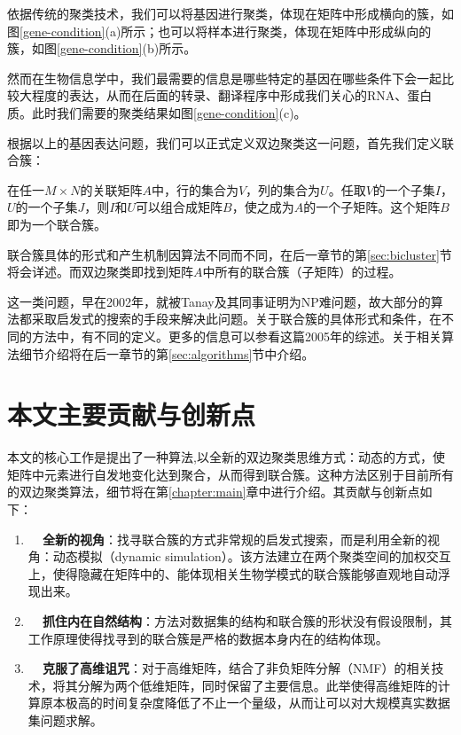 依据传统的聚类技术，我们可以将基因进行聚类，体现在矩阵中形成横向的簇，如图\ref{gene-condition}(a)所示；也可以将样本进行聚类，体现在矩阵中形成纵向的簇，如图\ref{gene-condition}(b)所示。


然而在生物信息学中，我们最需要的信息是哪些特定的基因在哪些条件下会一起比较大程度的表达，从而在后面的转录、翻译程序中形成我们关心的RNA、蛋白质。此时我们需要的聚类结果如图\ref{gene-condition}(c)。

根据以上的基因表达问题，我们可以正式定义双边聚类这一问题，首先我们定义联合簇：
\begin{dingyi}
\label{dingyi:bicluster}
在任一$M\times N$的关联矩阵$A$中，行的集合为$V$，列的集合为$U$。任取$V$的一个子集$I$，$U$的一个子集$J$，则$I$和$U$可以组合成矩阵$B$，使之成为$A$的一个子矩阵。这个矩阵$B$即为一个联合簇。
\end{dingyi}

联合簇具体的形式和产生机制因算法不同而不同，在后一章节的第\ref{sec:bicluster}节将会详述。而双边聚类即找到矩阵$A$中所有的联合簇（子矩阵）的过程。


这一类问题，早在2002年，就被Tanay及其同事证明为NP难问题，故大部分的算法都采取启发式的搜索的手段来解决此问题。关于联合簇的具体形式和条件，在不同的方法中，有不同的定义。更多的信息可以参看这篇2005年的综述。关于相关算法细节介绍将在后一章节的第\ref{sec:algorithms}节中介绍。

\section{本文主要贡献与创新点}
本文的核心工作是提出了一种算法\CoSync{},以全新的双边聚类思维方式：动态的方式，使矩阵中元素进行自发地变化达到聚合，从而得到联合簇。这种方法区别于目前所有的双边聚类算法，细节将在第\ref{chapter:main}章中进行介绍。其贡献与创新点如下：
\begin{enumerate}
  \item \textbf{~~全新的视角}：\CoSync{}找寻联合簇的方式非常规的启发式搜索，而是利用全新的视角：动态模拟（dynamic simulation）。该方法建立在两个聚类空间的加权交互上，使得隐藏在矩阵中的、能体现相关生物学模式的联合簇能够直观地自动浮现出来。
  \item \textbf{~~抓住内在自然结构}：\CoSync{}方法对数据集的结构和联合簇的形状没有假设限制，其工作原理使得找寻到的联合簇是严格的数据本身内在的结构体现。
  \item \textbf{~~克服了高维诅咒}：对于高维矩阵，\CoSync{}结合了非负矩阵分解（NMF）的相关技术，将其分解为两个低维矩阵，同时保留了主要信息。此举使得高维矩阵的计算原本极高的时间复杂度降低了不止一个量级，从而让\CoSync{}可以对大规模真实数据集问题求解。
\end{enumerate}

